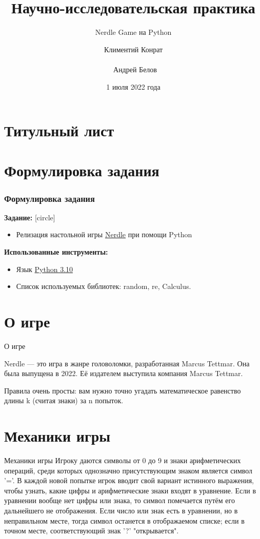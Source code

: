 \documentclass[handout]{beamer}
\title{Научно-исследовательская практика}
\subtitle{Nerdle Game на Python}
\author{Климентий Конрат\\\\\ Андрей Белов}
\institute{Институт физико-математических наук и информационных технологий БФУ им. И. Канта}
\date{1 июля 2022 года}
\begin{document}
	
	\section{Титульный лист}
	\begin{frame}
		\titlepage
	\end{frame}
	
	\section{Формулировка задания}
	\begin{frame}
		\frametitle{Формулировка задания}
		\textbf{Задание:}
		[circle]
		\begin{itemize}
            \item Релизация настольной игры \href{https://nerdlegame.org/}{Nerdle} при помощи Python 
        \end{itemize}
        \textbf{Использованные инструменты:}
        \begin{itemize}
            \item Язык \href{https://www.python.org/}{Python 3.10}
            \item Список используемых библиотек: random, re, Calculus.
        \end{itemize}
	\end{frame}
    
    \section{О игре}
    \begin{frame}{О игре}
        \item Nerdle — это игра в жанре головоломки, разработанная Marcus Tettmar. Она была выпущена в 2022. Её издателем выступила компания Marcus Tettmar.
        \item Правила очень просты: вам нужно точно угадать математическое равенство длины k (считая знаки) за n попыток. 
    \end{frame}
    
    \section{Механики игры}
    \begin{frame}{Механики игры}
    Игроку даются символы от 0 до 9 и знаки арифметических операций, среди которых однозначно присутствующим знаком является символ '='.
    В каждой новой попытке игрок вводит свой вариант истинного выражения, чтобы узнать, какие цифры и арифметические знаки входят в уравнение. Если в уравнении вообще нет цифры или знака, то символ помечается путём его дальнейшего не отображения. Если число или знак есть в уравнении, но в неправильном месте, тогда символ останется в отображаемом списке; если в точном месте, соответствующий знак '?' "открывается".   
    \end{frame}
        
\end{document}
